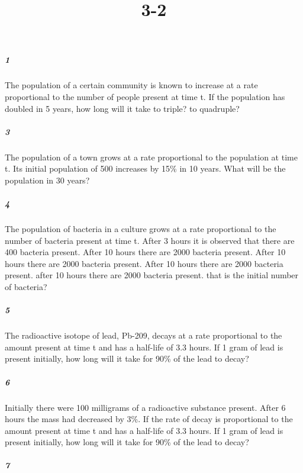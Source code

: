 \documentclass[fleqn]{article}
\title{3-2}
\begin{document}
\maketitle
\pagebreak


\subparagraph{1}

The population of a certain community is known to increase at a rate proportional to the number of people present at time t. If the population has doubled in 5 years, how long will it take to triple? to quadruple?

\vfill



\subparagraph{3}

The population of a town grows at a rate proportional to the population at time t. Its initial population of 500 increases by 15\% in 10 years. What will be the population in 30 years?

\vfill


\pagebreak


\subparagraph{4}

The population of bacteria in a culture grows at a rate proportional to the number of bacteria present at time t. After 3 hours it is observed that there are 400 bacteria present. After 10 hours there are 2000 bacteria present. After 10 hours there are 2000 bacteria present. After 10 hours there are 2000 bacteria present. after 10 hours there are 2000 bacteria present. that is the initial number of bacteria?

\vfill



\subparagraph{5}

The radioactive isotope of lead, Pb-209, decays at a rate proportional to the amount present at time t and has a half-life of 3.3 hours. If 1 gram of lead is present initially, how long will it take for 90\% of the lead to decay?

\vfill


\pagebreak


\subparagraph{6}

Initially there were 100 milligrams of a radioactive substance present. After 6 hours the mass had decreased by 3\%. If the rate of decay is proportional to the amount present at time t and has a half-life of 3.3 hours. If 1 gram of lead is present initially, how long will it take for 90\% of the lead to decay?

\vfill



\subparagraph{7}
\end{document}
